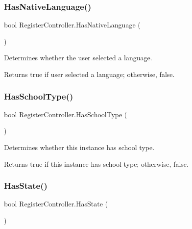 \subsubsection{\texorpdfstring{Has\+Native\+Language()}{HasNativeLanguage()}}
{\footnotesize\ttfamily bool Register\+Controller.\+Has\+Native\+Language (\begin{DoxyParamCaption}{ }\end{DoxyParamCaption})\hspace{0.3cm}{\ttfamily [inline]}}



Determines whether the user selected a language. 

\begin{DoxyReturn}{Returns}
{\ttfamily true} if user selected a language; otherwise, {\ttfamily false}.
\end{DoxyReturn}
\mbox{\label{classRegisterController_a9641e09116e823648addfc362af8fb24}} 
\subsubsection{\texorpdfstring{Has\+School\+Type()}{HasSchoolType()}}
{\footnotesize\ttfamily bool Register\+Controller.\+Has\+School\+Type (\begin{DoxyParamCaption}{ }\end{DoxyParamCaption})\hspace{0.3cm}{\ttfamily [inline]}}



Determines whether this instance has school type. 

\begin{DoxyReturn}{Returns}
{\ttfamily true} if this instance has school type; otherwise, {\ttfamily false}.
\end{DoxyReturn}
\mbox{\label{classRegisterController_aa5c83aee5c268b2338d29a9f1fd0282f}} 
\subsubsection{\texorpdfstring{Has\+State()}{HasState()}}
{\footnotesize\ttfamily bool Register\+Controller.\+Has\+State (\begin{DoxyParamCaption}{ }\end{DoxyParamCaption})\hspace{0.3cm}{\ttfamily [inline]}}



